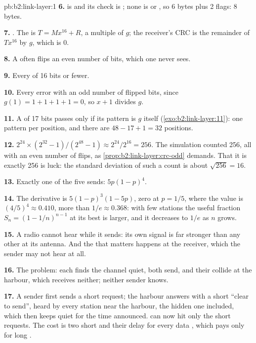 \begin{solution}{pb:b2:link-layer:1}
\textbf{6.}  is  and its check is ; none is  or , so 6
bytes plus 2 flags: 8 bytes.

\textbf{7.} . The  is $T = M x^{16} + R$, a multiple of $g$; the receiver's CRC is the
remainder of $T x^{16}$ by $g$, which is 0.

\textbf{8.} A  often flips an even number of bits, which one  never sees.

\textbf{9.} Every  of 16 bits or fewer.

\textbf{10.} Every error with an odd number of flipped bits, since $g(1) = 1 + 1 + 1 + 1 = 0$, so $x + 1$ divides $g$.

\textbf{11.} A  of 17 bits passes only if its pattern is $g$ itself (\cref{exo:b2:link-layer:11}): one pattern
per position, and there are $48 - 17 + 1 = 32$ positions.

\textbf{12.} $2^{24} \times (2^{32} - 1)/(2^{48} - 1) \approx 2^{24}/2^{16} = 256$. The simulation counted 256, all
with an even number of flips, as \cref{prop:b2:link-layer:crc-odd} demands. That it is exactly 256 is luck: the
standard deviation of such a count is about $\sqrt{256} = 16$.

\textbf{13.} Exactly one of the five sends: $5p(1 - p)^4$.

\textbf{14.} The derivative is $5(1 - p)^3(1 - 5p)$, zero at $p = 1/5$, where the value is $(4/5)^4 \approx 0.410$,
more than $1/e \approx 0.368$: with few stations the useful fraction $S_n = (1 - 1/n)^{n-1}$ at its best is larger,
and it decreases to $1/e$ as $n$ grows.

\textbf{15.} A radio cannot hear while it sends: its own signal is far stronger than any other at its antenna. And the
 that matters happens at the receiver, which the sender may not hear at all.

\textbf{16.} The  problem: each finds the channel quiet, both send, and their  collide at the
harbour, which receives neither; neither sender knows.

\textbf{17.} A sender first sends a short request; the harbour answers with a short ``clear to send'', heard by every
station near the harbour, the hidden one included, which then keeps quiet for the time announced.  can now
hit only the short requests. The cost is two short  and their delay for every data , which pays only for
long .


\end{solution}
